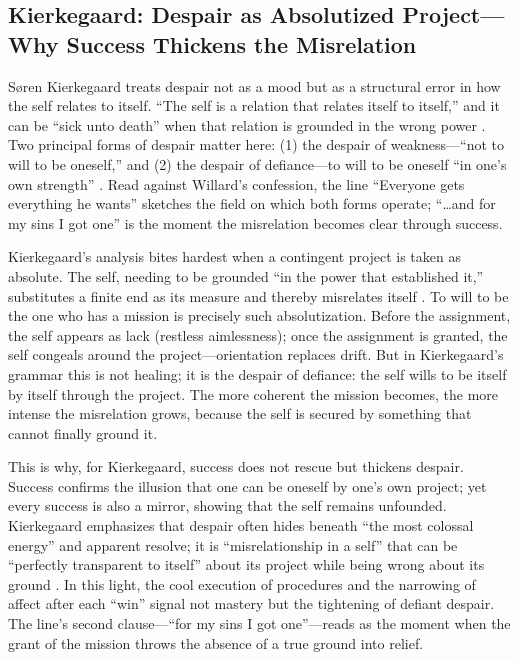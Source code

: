 \subsection*{Kierkegaard: Despair as Absolutized Project—Why Success Thickens the
	Misrelation}
\label{ssec:iii-kierkegaard}
Søren Kierkegaard treats despair not as a mood but as a structural error in how the self relates
to itself. ``The self is a relation that relates itself to itself,'' and it can be ``sick unto
death'' when that relation is grounded in the wrong power
\parencite[pp.~49--52]{KierkegaardSUD1980}.
Two principal forms of despair matter here: (1) the despair of weakness—``not to will to be
oneself,'' and (2) the despair of defiance—to will to be oneself ``in one's own strength''
\parencite[pp.~52--61, 69--73]{KierkegaardSUD1980}. Read against Willard's confession, the line
``Everyone gets everything he wants'' sketches the field on which both forms operate;
``\ldots and for my sins I got one'' is the moment the misrelation becomes clear through
success.

Kierkegaard's analysis bites hardest when a contingent project is taken as absolute. The self,
needing to be grounded ``in the power that established it,'' substitutes a finite end as its
measure and thereby misrelates itself \parencite[pp.~79--83]{KierkegaardSUD1980}. To will to be
the one who has a mission is precisely such absolutization. Before the assignment, the self
appears as lack (restless aimlessness); once the assignment is granted, the self congeals around
the project—orientation replaces drift. But in Kierkegaard's grammar this is not healing; it is
the despair of defiance: the self wills to be itself by itself through the project. The more
coherent the mission becomes, the more intense the misrelation grows, because the self is
secured by something that cannot finally ground it.

This is why, for Kierkegaard, success does not rescue but thickens despair. Success confirms
the illusion that one can be oneself by one's own project; yet every success is also a mirror,
showing that the self remains unfounded. Kierkegaard emphasizes that despair often hides beneath
``the most colossal energy'' and apparent resolve; it is ``misrelationship in a self'' that can
be ``perfectly transparent to itself'' about its project while being wrong about its ground
\parencite[pp.~72--76]{KierkegaardSUD1980}. In this light, the cool execution of procedures and
the narrowing of affect after each ``win'' signal not mastery but the tightening of defiant
despair. The line's second clause—``for my sins I got one''—reads as the moment when the grant
of the mission throws the absence of a true ground into relief.

